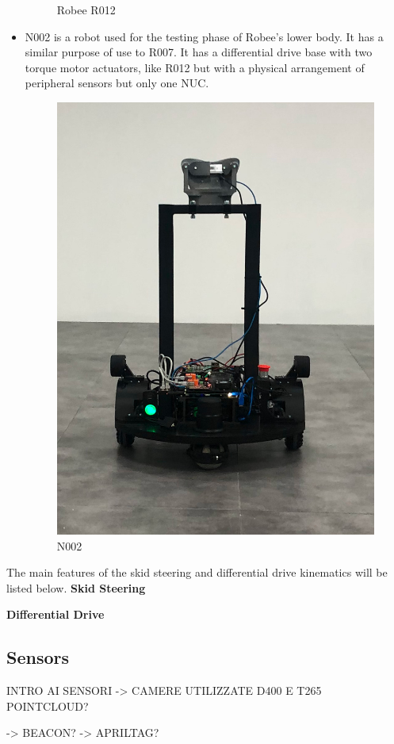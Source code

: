 \begin{itemize}
\begin{figure}[H]
        \caption{Robee R012}
        \label{fig:r012}
    \end{figure}
    \item N002 is a robot used for the testing phase of Robee's lower body. It has a similar purpose of use to R007.
    It has a differential drive base with two torque motor actuators, like R012 but with a physical arrangement of peripheral sensors but only one NUC.
    \begin{figure}[H]
        \centering
        \includegraphics[scale=0.15]{Images/Chapter 3/n002.jpg}
        \caption{N002}
        \label{fig:N002}
    \end{figure}
\end{itemize}
The main features of the skid steering and differential drive kinematics will be listed below.
\textbf{Skid Steering}

\textbf{Differential Drive}

\subsection{Sensors}
INTRO AI SENSORI 
-> CAMERE UTILIZZATE D400 E T265
\newpage
POINTCLOUD?

\newpage
-> BEACON?
-> APRILTAG?
